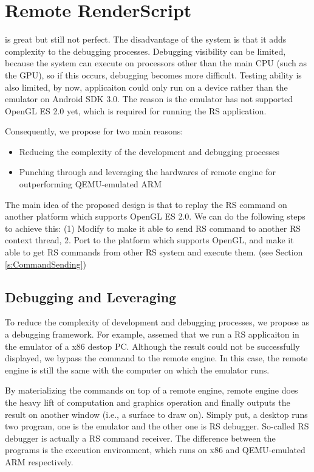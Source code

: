 \chapter{Remote RenderScript}
\label{c:RRS}
\RS{} is great but still not perfect. The disadvantage of the \RS{} system is that it adds complexity to the debugging processes. Debugging visibility can be limited, because the \RS{} system can execute on processors other than the main CPU (such as the GPU), so if this occurs, debugging becomes more difficult. Testing ability is also limited, by now, \RS{} applicaiton could only run on a device rather than the emulator on Android SDK 3.0. The reason is the emulator has not supported OpenGL ES 2.0 yet, which is required for running the RS application.

Consequently, we propose \RRS{} for two main reasons:
\begin{itemize}
	\item Reducing the complexity of the development and debugging processes
	\item Punching through and leveraging the hardwares of remote engine for outperforming QEMU-emulated ARM 
\end{itemize}

The main idea of the proposed design is that to replay the RS command on another platform which supports OpenGL ES 2.0. We can do the following steps to achieve this: (1) Modify \RS{} to make it able to send RS command to another RS context thread, 2. Port \RS{} to the platform which supports OpenGL, and make it able to get RS commands from other RS system and execute them. 
(see Section \ref{s:CommandSending})


\section{Debugging and Leveraging}
\label{s:debugging}


To reduce the complexity of development and debugging processes, we propose \RRS{} as a debugging framework. For example, assemed that we run a RS applicaiton in the emulator of a x86 destop PC. Although the result could not be successfully displayed, we bypass the command to the remote engine. In this case, the remote engine is still the same with the computer on which the emulator runs. 

By materializing the commands on top of a remote engine, remote engine does the heavy lift of computation and graphics operation and finally outputs the result on another window (i.e., a surface to draw on). Simply put, a desktop runs two program, one is the emulator and the other one is RS debugger. So-called RS debugger is actually a RS command receiver. The difference between the programs is the execution environment, which runs on x86 and QEMU-emulated ARM respectively.

